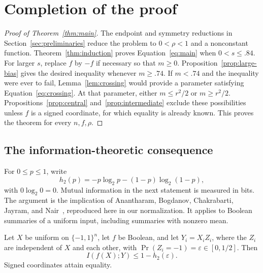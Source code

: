\section{Completion of the proof}\label{sec:completion}
\begin{proof}[Proof of Theorem~\ref{thm:main}]
The endpoint and symmetry reductions in Section~\ref{sec:preliminaries} reduce the problem to \(0<\rho<1\) and a nonconstant function. Theorem~\ref{thm:induction} proves Equation~\eqref{eq:main} when \(0<s\le .84\).
For larger \(s\), replace \(f\) by \(-f\) if necessary so that \(m\ge0\).
Proposition~\ref{prop:large-bias} gives the desired inequality whenever \(m\ge .74\).
If \(m<.74\) and the inequality were ever to fail, Lemma~\ref{lem:crossing} would provide a parameter satisfying Equation~\eqref{eq:crossing}.
At that parameter, either \(m\le r^2/2\) or \(m\ge r^2/2\).
Propositions~\ref{prop:central} and~\ref{prop:intermediate} exclude these possibilities unless \(f\) is a signed coordinate, for which equality is already known.
This proves the theorem for every \(n,f,\rho\).
\end{proof}


\subsection{The information-theoretic consequence}
For $0\le p\le1$, write
\[
 h_2(p)=-p\log_2p-(1-p)\log_2(1-p),
\]
with $0\log_2 0=0$. Mutual information in the next statement is measured
in bits. The argument is the implication of
Anantharam, Bogdanov, Chakrabarti, Jayram, and
Nair~\cite[Proposition~1 and Lemma~1]{ABCJN}, reproduced here in our
normalization. It applies to Boolean summaries of a uniform input,
including summaries with nonzero mean.

\begin{corollary}\label{cor:ck}
Let $X$ be uniform on $\{-1,1\}^n$, let $f$ be Boolean, and let
$Y_i=X_iZ_i$, where the $Z_i$ are independent of $X$ and each other,
with $\Pr(Z_i=-1)=\varepsilon\in[0,1/2]$. Then
\[
 I(f(X);Y)\le1-h_2(\varepsilon).
\]
Signed coordinates attain equality.
\end{corollary}

